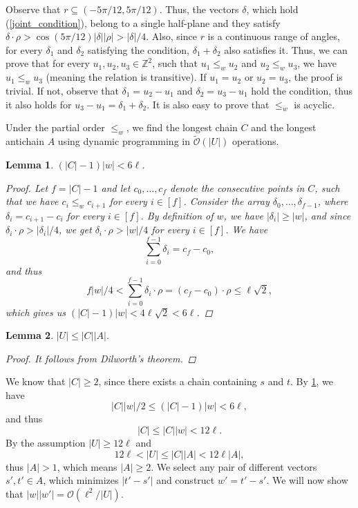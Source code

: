 \documentclass[11pt]{article}
\newcommand{\Z}{\mathbb{Z}}
\renewcommand{\O}{\mathcal{O}}
\newcommand{\tO}{\tilde{\mathcal{O}}}
\theoremstyle{plain}
\newtheorem{lemma}{Lemma}
\theoremstyle{definition}
\theoremstyle{remark}
\begin{document}
Observe that $r \subseteq (-5 \pi / 12, 5 \pi / 12)$.
Thus, the vectors $\delta$, which hold (\ref{joint_condition}), belong to a single half-plane and they satisfy $\delta \cdot \rho > \cos(5\pi / 12)|\delta||\rho| > |\delta| / 4$.
Also, since $r$ is a continuous range of angles, for every $\delta_1$ and $\delta_2$ satisfying the condition, $\delta_1 + \delta_2$ also satisfies it.
Thus, we can prove that for every $u_1, u_2, u_3 \in \Z^2$, such that $u_1 \le_w u_2$ and $u_2 \le_w u_3$, we have $u_1 \le_w u_3$ (meaning the relation is transitive).
If $u_1 = u_2$ or $u_2 = u_3$, the proof is trivial.
If not, observe that $\delta_1 = u_2 - u_1$ and $\delta_2 = u_3 - u_1$ hold the condition, 
thus it also holds for $u_3 - u_1 = \delta_1 + \delta_2$.
It is also easy to prove that $\le_w$ is acyclic.

Under the partial order $\le_w$, we find the longest chain $C$ and the longest antichain $A$ using dynamic programming in $\tO(|U|)$ operations.

\begin{lemma}\label{C_ineq}
	$(|C| - 1) |w| < 6\ell$. 
	\begin{proof}
		Let $f = |C| - 1$ and
		let $c_0, \dots, c_{f}$ denote the consecutive points in $C$, such that we have $c_i \le_w c_{i + 1}$ for every $i \in [f]$.
		Consider the array $\delta_0, \dots, \delta_{f - 1}$, where $\delta_i = c_{i + 1} - c_i$ for every $i \in [f]$.
		By definition of $w$, we have $|\delta_i| \ge |w|$,
		and since $\delta_i \cdot \rho > |\delta_i| / 4$, we get
		$\delta_i \cdot \rho > |w| / 4$ for every $i \in [f]$.
		We have
		\[ \sum_{i = 0}^{f - 1} \delta_i = c_f - c_0,\]
		and thus
		\[ f|w| / 4 < \sum_{i = 0}^{f - 1} \delta_i \cdot \rho = (c_f - c_0) \cdot \rho \le \ell \sqrt{2}, \]
		which gives us $(|C| - 1)|w| < 4\ell \sqrt{2} < 6\ell$.
	\end{proof}
\end{lemma}

\begin{lemma}\label{dilworth}
	$|U| \le |C| |A|$.
	\begin{proof}
		It follows from Dilworth's theorem.
	\end{proof}
\end{lemma}

We know that $|C| \ge 2$, since there exists a chain containing $s$ and $t$.
By \cref{C_ineq}, we have
\[ |C||w| / 2 \le (|C| - 1)|w| < 6\ell, \]
and thus
\[ |C| \le |C||w| < 12\ell. \]
By the assumption $|U| \ge 12\ell$ and 
\[12 \ell < |U| \le |C| |A| < 12\ell|A|,\]
thus $|A| > 1$, which means $|A| \ge 2$.
We select any pair of different vectors $s', t' \in A$, which minimizes $|t' - s'|$ and construct $w' = t' - s'$.
We will now show that $|w||w'| = \O(\ell^2 / |U|)$.
\end{document}
